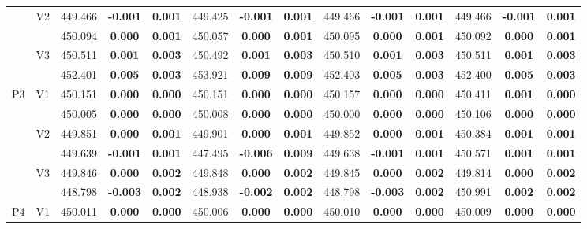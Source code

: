 \documentclass[11pt,a4paper]{article}
\begin{document}
{\begin{sidewaystable}[H]
{{\begin{tabular}{cc|ccc|ccc|ccc|ccc|}
   & \multirow{2}{*}{V2} & 449.466 & \textbf{-0.001} & \textbf{0.001} & 449.425 & \textbf{-0.001} & \textbf{0.001} & 449.466 & \textbf{-0.001} & \textbf{0.001} & 449.466 & \textbf{-0.001} & \textbf{0.001} \\ 
   &  & 450.094 & \textbf{0.000} & \textbf{0.001} & 450.057 & \textbf{0.000} & \textbf{0.001} & 450.095 & \textbf{0.000} & \textbf{0.001} & 450.092 & \textbf{0.000} & \textbf{0.001} \\ 
   & \multirow{2}{*}{V3} & 450.511 & \textbf{0.001} & \textbf{0.003} & 450.492 & \textbf{0.001} & \textbf{0.003} & 450.510 & \textbf{0.001} & \textbf{0.003} & 450.511 & \textbf{0.001} & \textbf{0.003} \\ 
   &  & 452.401 & \textbf{0.005} & \textbf{0.003} & 453.921 & \textbf{0.009} & \textbf{0.009} & 452.403 & \textbf{0.005} & \textbf{0.003} & 452.400 & \textbf{0.005} & \textbf{0.003} \\ 
   \hline \hline\multirow{6}{*}{P3} & \multirow{2}{*}{V1} & 450.151 & \textbf{0.000} & \textbf{0.000} & 450.151 & \textbf{0.000} & \textbf{0.000} & 450.157 & \textbf{0.000} & \textbf{0.000} & 450.411 & \textbf{0.001} & \textbf{0.000} \\ 
   &  & 450.005 & \textbf{0.000} & \textbf{0.000} & 450.008 & \textbf{0.000} & \textbf{0.000} & 450.000 & \textbf{0.000} & \textbf{0.000} & 450.106 & \textbf{0.000} & \textbf{0.000} \\ 
   & \multirow{2}{*}{V2} & 449.851 & \textbf{0.000} & \textbf{0.001} & 449.901 & \textbf{0.000} & \textbf{0.001} & 449.852 & \textbf{0.000} & \textbf{0.001} & 450.384 & \textbf{0.001} & \textbf{0.001} \\ 
   &  & 449.639 & \textbf{-0.001} & \textbf{0.001} & 447.495 & \textbf{-0.006} & \textbf{0.009} & 449.638 & \textbf{-0.001} & \textbf{0.001} & 450.571 & \textbf{0.001} & \textbf{0.001} \\ 
   & \multirow{2}{*}{V3} & 449.846 & \textbf{0.000} & \textbf{0.002} & 449.848 & \textbf{0.000} & \textbf{0.002} & 449.845 & \textbf{0.000} & \textbf{0.002} & 449.814 & \textbf{0.000} & \textbf{0.002} \\ 
   &  & 448.798 & \textbf{-0.003} & \textbf{0.002} & 448.938 & \textbf{-0.002} & \textbf{0.002} & 448.798 & \textbf{-0.003} & \textbf{0.002} & 450.991 & \textbf{0.002} & \textbf{0.002} \\ 
   \hline \hline\multirow{6}{*}{P4} & \multirow{2}{*}{V1} & 450.011 & \textbf{0.000} & \textbf{0.000} & 450.006 & \textbf{0.000} & \textbf{0.000} & 450.010 & \textbf{0.000} & \textbf{0.000} & 450.009 & \textbf{0.000} & \textbf{0.000} \\ 

\end{tabular}}}
\end{sidewaystable}}
\end{document}
